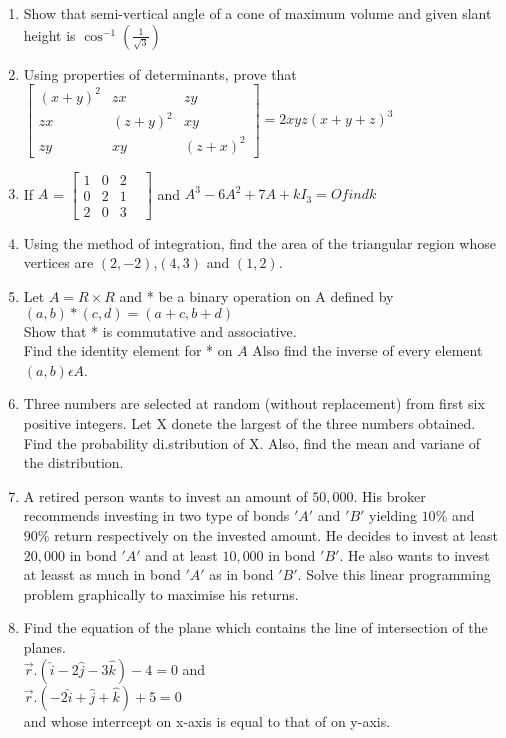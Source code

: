 \documentclass[12pt,-letter paper]{article}
\providecommand{\myvec}[1]{\ensuremath{\begin{bmatrix}#1\end{bmatrix}}}
\providecommand{\brak}[1]{\ensuremath{\left(#1\right)}}
\begin{document}
\begin{enumerate}
\item Show that semi-vertical angle of a cone of maximum volume and given slant height is $\cos^{-1}\brak{\frac{1}{\sqrt{3}}}$
\item Using properties of determinants, prove that \\
$\myvec{\brak{x+y}^2 & zx & zy \\zx & \brak{z+y}^2 & xy \\zy & xy & \brak{z+x}^2} = 2xyz\brak{x+y+z}^3$
\item If $A$ = $\myvec{1&0&2&\\0&2&1\\2&0&3&}$ and $A^3-6A^2+7A+kI_3 = O find k$
\item Using the method of integration, find the area of the triangular region whose vertices are $\brak{2, -2}$,$\brak{4, 3}$ and $\brak{1, 2}$.
\item Let $A=R \times R$ and * be a binary operation on A defined by \\ $\brak{a, b}*\brak{c, d}=\brak{a+c, b+d}$ \\ Show that * is commutative and associative. \\ Find the identity element for * on $A$ Also find the inverse of every element $\brak{a, b}\epsilon A$.
\item Three numbers are selected at random (without replacement) from first six positive integers. Let X donete the largest of the three numbers obtained. Find the probability di.stribution of X. Also, find the mean and variane of the distribution.
\item A retired person wants to invest an amount of \rupee $50,000$. His broker recommends investing in two type of bonds $'A'$ and $'B'$ yielding $10\%$ and $90\%$ return respectively on the invested amount. He decides to invest at least \rupee $20,000$ in bond $'A'$ and at least \rupee $10,000$ in bond $'B'$. He also wants to invest at leasst as much in bond $'A'$ as in bond $'B'$. Solve this linear  programming problem graphically to maximise his returns. 
\item Find the equation of the plane which contains the line of intersection of the planes. \\ $\overset{\rightarrow}{r}$.$\brak{\hat{i}-2\hat{j}-3\hat{k}}-4=0$ and \\ $\overset{\rightarrow}{r}$.$\brak{-2\hat{i}+\hat{j}+\hat{k}}+5=0$ \\ and whose interrcept on x-axis is equal to that of on y-axis.	

\end{enumerate}
\end{document}
